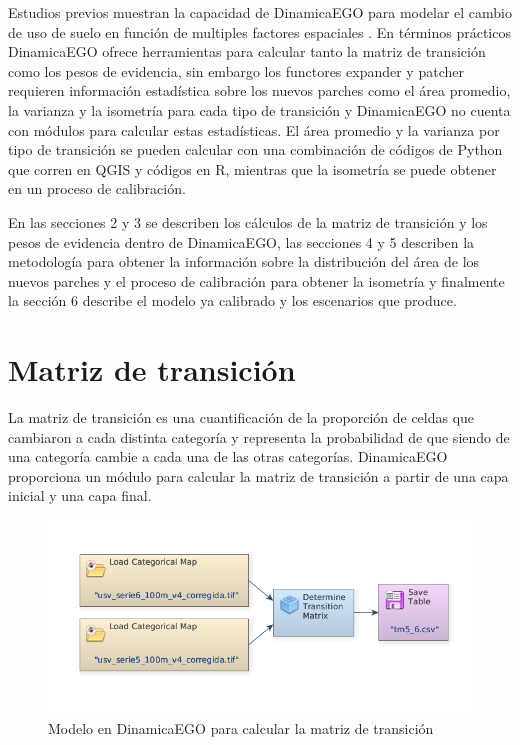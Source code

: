 \documentclass[12pt,a4paper,oldfontcommands]{article}
\begin{document}
Estudios previos muestran la capacidad de DinamicaEGO para modelar el cambio de uso de suelo en función de multiples factores espaciales \cite{cheng_land_2020}. En términos prácticos DinamicaEGO ofrece herramientas para calcular tanto la matriz de transición como los pesos de evidencia, sin embargo los functores expander y patcher requieren información estadística sobre los nuevos parches como el área promedio, la varianza y la isometría para cada tipo de transición y DinamicaEGO no cuenta con módulos para calcular estas estadísticas. El área promedio y la varianza por tipo de transición se pueden calcular con una combinación de códigos de Python que corren en QGIS y códigos en R, mientras que la isometría se puede obtener en un proceso de calibración.

En las secciones 2 y 3 se describen los cálculos de la matriz de transición y los pesos de evidencia dentro de DinamicaEGO, las secciones 4 y 5 describen la metodología para obtener la información sobre la distribución del área de los nuevos parches y el proceso de calibración para obtener la isometría y finalmente la sección 6 describe el modelo ya calibrado y los escenarios que produce.





\section{Matriz de transición}
La matriz de transición es una cuantificación de la proporción de celdas que cambiaron a cada distinta categoría y representa la probabilidad de que siendo de una categoría cambie a cada una de las otras categorías. DinamicaEGO proporciona un módulo para calcular la matriz de transición a partir de una capa inicial y una capa final.

\begin{figure}[h]
	\centering
	\includegraphics[width=1\textwidth]{./figuras/modelo_matriz.png}
	\caption{Modelo en DinamicaEGO para calcular la matriz de transición}
\end{figure}
\label{fig:modelo_matriz}
\bigskip
\end{document}

